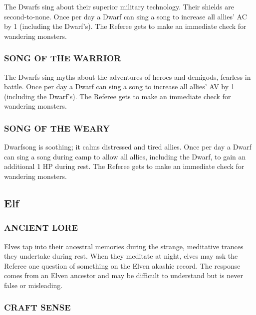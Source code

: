 \documentclass[twoside]{article}
\begin{document}
The Dwarfs sing about their superior military technology. Their shields are second-to-none. Once per day a Dwarf can sing a song to increase all allies' AC by 1 (including the Dwarf's). The Referee gets to make an immediate check for wandering monsters.

\subsubsection*{\footnotesize{S}\scriptsize{ONG OF THE} \footnotesize{W}\scriptsize{ARRIOR}\normalsize}

The Dwarfs sing myths about the adventures of heroes and demigods, fearless in battle. Once per day a Dwarf can sing a song to increase all allies' AV by 1 (including the Dwarf's). The Referee gets to make an immediate check for wandering monsters.

\subsubsection*{\footnotesize{S}\scriptsize{ONG OF THE} \footnotesize{W}\scriptsize{EARY}\normalsize}

Dwarfsong is soothing; it calms distressed and tired allies. Once per day a Dwarf can sing a song during camp to allow all allies, including the Dwarf, to gain an additional 1 HP during rest. The Referee gets to make an immediate check for wandering monsters.

\subsection*{Elf}

\subsubsection*{\footnotesize{A}\scriptsize{NCIENT} \footnotesize{L}\scriptsize{ORE}\normalsize}

Elves tap into their ancestral memories during the strange, meditative trances they undertake during rest. When they meditate at night, elves may ask the Referee one question of something on the Elven akashic record. The response comes from an Elven ancestor and may be difficult to understand but is never false or misleading. 

\subsubsection*{\footnotesize{C}\scriptsize{RAFT} \footnotesize{S}\scriptsize{ENSE}\normalsize}
\end{document}
